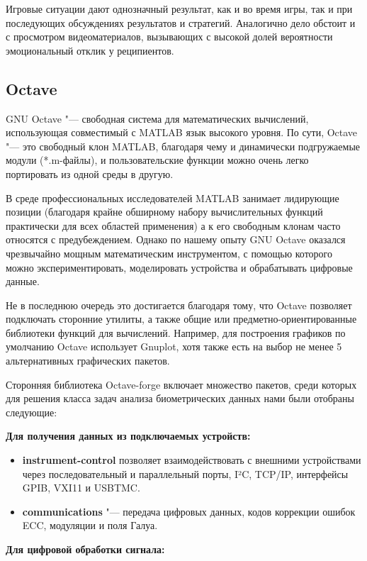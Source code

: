 \documentclass[10pt, a5paper]{article}
\begin{document}
Игровые ситуации дают однозначный результат, как и во время игры, так и при последующих обсуждениях результатов и стратегий. Аналогично дело обстоит и с просмотром видеоматериалов, вызывающих с высокой долей вероятности эмоциональный отклик у реципиентов.

\subsection*{Octave}

GNU Octave "--- свободная система для математических вычислений, использующая совместимый с MATLAB язык высокого уровня.
По сути, Octave "--- это свободный клон MATLAB, благодаря чему и динамически подгружаемые модули (*.m-файлы), и пользовательские функции можно очень легко портировать из одной среды в другую.

В среде профессиональных исследователей MATLAB занимает лидирующие позиции (благодаря крайне обширному набору вычислительных функций практически для всех областей применения) а к его свободным клонам часто относятся с предубеждением. Однако по нашему опыту GNU Octave оказался чрезвычайно мощным математическим инструментом, с помощью которого можно экспериментировать, моделировать устройства и обрабатывать цифровые данные.

Не в последнюю очередь это достигается благодаря тому, что Octave позволяет подключать сторонние утилиты, а также общие или предметно-ориентированные библиотеки функций для вычислений. 
Например, для построения графиков по умолчанию Octave использует Gnuplot, хотя также есть на выбор не менее 5 альтернативных графических пакетов.

Сторонняя библиотека Octave-forge включает множество пакетов, среди которых для решения класса задач анализа биометрических данных нами были отобраны следующие:

\textbf{Для получения данных из подключаемых устройств:}

\begin{itemize}
  \item \textbf{instrument-control} позволяет взаимодействовать с внешними устройствами через последовательный и параллельный \linebreak порты, I²C, TCP/IP, интерфейсы GPIB, VXI11 и USBTMC.
  \item \textbf{communications} "--- передача цифровых данных, кодов коррекции ошибок ECC, модуляции и поля Галуа.
\end{itemize}

\textbf{Для цифровой обработки сигнала:}
\end{document}
